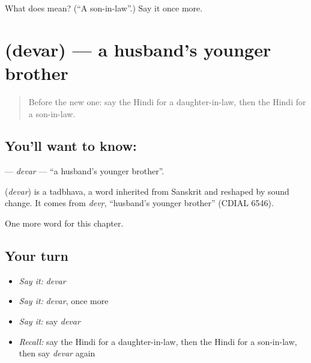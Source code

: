 \begin{tcolorbox}[breakable,colback=teal!4,colframe=teal!35!black,title={Before you move on}]
What does  mean? (\textquotedblleft{}A son-in-law\textquotedblright{}.) Say it once more.
\end{tcolorbox}
\section[\texorpdfstring{\hi{देवर} (devar)}{देवर (devar)}]{ (devar) — a husband's younger brother}

\label{lesson:HI-C255-devar}



\begin{quote}
Before the new one: say the Hindi for a daughter-in-law, then the Hindi for a son-in-law.
\end{quote}

\subsection*{You'll want to know: }
\textbf{} — \emph{devar} — \textquotedblleft{}a husband's younger brother\textquotedblright{}.

\begin{cousinweb}
\textbf{} (\emph{devar}) is a tadbhava, a word inherited from Sanskrit and reshaped by sound change. It comes from \emph{devṛ}, \textquotedblleft{}husband's younger brother\textquotedblright{} (CDIAL 6546).
\end{cousinweb}

\begin{grammarlens}[title={What you've built}]
One more word for this chapter.
\end{grammarlens}

\subsection*{Your turn}
\begin{itemize}
\raggedright
  \item \emph{Say it:} \emph{devar}
  \item \emph{Say it:} \emph{devar}, once more
  \item \emph{Say it:} say \emph{devar}
  \item \emph{Recall:} say the Hindi for a daughter-in-law, then the Hindi for a son-in-law, then say \emph{devar} again
\end{itemize}

